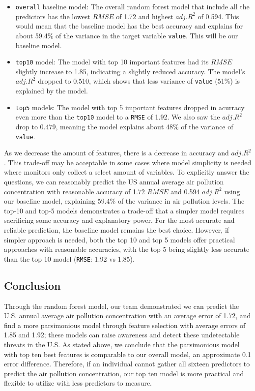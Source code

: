 \documentclass[
]{article}
\providecommand{\tightlist}{%
  \setlength{\itemsep}{0pt}\setlength{\parskip}{0pt}}
\begin{document}
\begin{itemize}
\tightlist
\item
  \texttt{overall} baseline model: The overall random forest model that
  include all the predictors has the lowest \(RMSE\) of 1.72 and highest
  \(adj. R^2\) of 0.594. This would mean that the baseline model has the
  best accuracy and explains for about 59.4\% of the variance in the
  target variable \texttt{value}. This will be our baseline model.
\item
  \texttt{top10} model: The model with top 10 important features had its
  \(RMSE\) slightly increase to 1.85, indicating a slightly reduced
  accuracy. The model's \(adj. R^2\) dropped to 0.510, which shows that
  less variance of \texttt{value} (51\%) is explained by the model.
\item
  \texttt{top5} models: The model with top 5 important features dropped
  in acurracy even more than the \texttt{top10} model to a \texttt{RMSE}
  of 1.92. We also saw the \(adj. R^2\) drop to 0.479, meaning the model
  explains about 48\% of the variance of \texttt{value}.
\end{itemize}

As we decrease the amount of features, there is a decrease in accuracy
and \(adj. R^2\). This trade-off may be acceptable in some cases where
model simplicity is needed where monitors only collect a select amount
of variables. To explicitly answer the questions, we can reasonably
predict the US annual average air pollution concentration with
reasonable accuracy of 1.72 \(RMSE\) and 0.594 \(adj. R^2\) using our
baseline model, explaining 59.4\% of the variance in air pollution
levels. The top-10 and top-5 models demonstrates a trade-off that a
simpler model requires sacrificing some accuracy and explanatory power.
For the most accurate and reliable prediction, the baseline model
remains the best choice. However, if simpler approach is needed, both
the top 10 and top 5 models offer practical approaches with reasonable
accuracies, with the top 5 being slightly less accurate than the top 10
model (\texttt{RMSE}: 1.92 vs 1.85).

\subsection{Conclusion}\label{conclusion}

Through the random forest model, our team demonstrated we can predict
the U.S. annual average air pollution concentration with an average
error of 1.72, and find a more parsimonious model through feature
selection with average errors of 1.85 and 1.92; these models can raise
awareness and detect these undetectable threats in the U.S. As stated
above, we conclude that the parsimonious model with top ten best
features is comparable to our overall model, an approximate 0.1 error
difference. Therefore, if an individual cannot gather all sixteen
predictors to predict the air pollution concentration, our top ten model
is more practical and flexible to utilize with less predictors to
measure.
\end{document}
